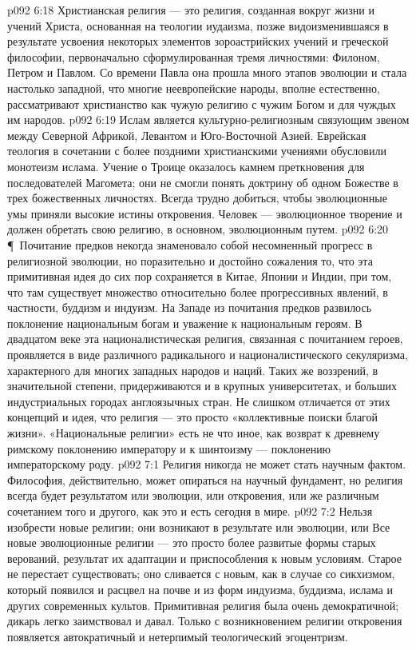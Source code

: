 \vs p092 6:18 Христианская религия --- это религия, созданная вокруг жизни и учений Христа, основанная на теологии иудаизма, позже видоизменившаяся в результате усвоения некоторых элементов зороастрийских учений и греческой философии, первоначально сформулированная тремя личностями: Филоном, Петром и Павлом. Со времени Павла она прошла много этапов эволюции и стала настолько западной, что многие неевропейские народы, вполне естественно, рассматривают христианство как чужую религию с чужим Богом и для чуждых им народов.
\vs p092 6:19 Ислам является культурно\hyp{}религиозным связующим звеном между Северной Африкой, Левантом и Юго\hyp{}Восточной Азией. Еврейская теология в сочетании с более поздними христианскими учениями обусловили монотеизм ислама. Учение о Троице оказалось камнем преткновения для последователей Магомета; они не смогли понять доктрину об одном Божестве в трех божественных личностях. Всегда трудно добиться, чтобы эволюционные умы  приняли высокие истины откровения. Человек --- эволюционное творение и должен обретать свою религию, в основном, эволюционным путем.
\vs p092 6:20 \P\ Почитание предков некогда знаменовало собой несомненный прогресс в религиозной эволюции, но поразительно и достойно сожаления то, что эта примитивная идея до сих пор сохраняется в Китае, Японии и Индии, при том, что там существует множество относительно более прогрессивных явлений, в частности, буддизм и индуизм. На Западе из почитания предков развилось поклонение национальным богам и уважение к национальным героям. В двадцатом веке эта националистическая религия, связанная с почитанием героев, проявляется в виде различного радикального и националистического секуляризма, характерного для многих западных народов и наций. Таких же воззрений, в значительной степени, придерживаются и в крупных университетах, и больших индустриальных городах англоязычных стран. Не слишком отличается от этих концепций и идея, что религия --- это просто «коллективные поиски благой жизни». «Национальные религии» есть не что иное, как возврат к древнему римскому поклонению императору и к шинтоизму --- поклонению императорскому роду.
\vs p092 7:1 Религия никогда не может стать научным фактом. Философия, действительно, может опираться на научный фундамент, но религия всегда будет результатом или эволюции, или откровения, или же различным сочетанием того и другого, как это и есть сегодня в мире.
\vs p092 7:2 Нельзя изобрести новые религии; они возникают в результате или эволюции, или  Все новые эволюционные религии --- это просто более развитые формы старых верований, результат их адаптации и приспособления к новым условиям. Старое не перестает существовать; оно сливается с новым, как в случае со сикхизмом, который появился и расцвел на почве и из форм индуизма, буддизма, ислама и других современных культов. Примитивная религия была очень демократичной; дикарь легко заимствовал и давал. Только с возникновением религии откровения появляется автократичный и нетерпимый теологический эгоцентризм.

